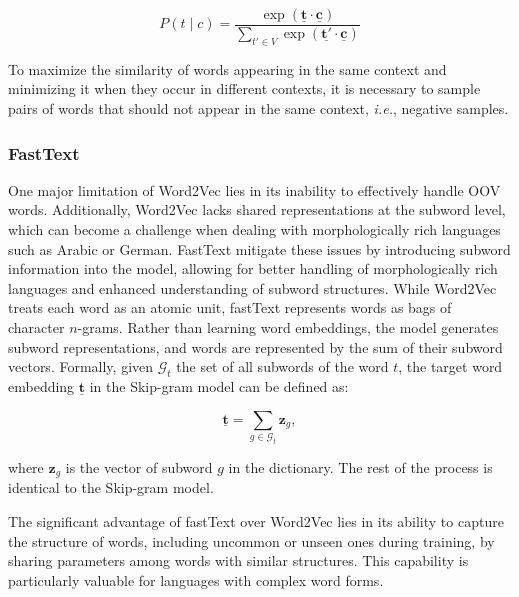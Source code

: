 \begin{equation}
    P(t \mid c) = \frac{\exp (\bm{\underline{t}} \cdot \bm{\underline{c}})}{\sum_{t' \in V} \exp (\bm{\underline{t'}} \cdot \bm{\underline{c}})}
\end{equation}

To maximize the similarity of words appearing in the same context and minimizing it when they occur in different contexts, it is necessary to sample pairs of words that should not appear in the same context, \textit{i.e.}, negative samples. 


\subsubsection{FastText} One major limitation of Word2Vec lies in its inability to effectively handle \ac{OOV} words. Additionally, Word2Vec lacks shared representations at the subword level, which can become a challenge when dealing with morphologically rich languages such as Arabic or German. FastText \citet{bojanowski2017enriching} mitigate these issues by introducing subword information into the model, allowing for better handling of morphologically rich languages and enhanced understanding of subword structures. While Word2Vec treats each word as an atomic unit, fastText represents words as bags of character $n$-grams. Rather than learning word embeddings, the model generates subword representations, and words are represented by the sum of their subword vectors. Formally, given $\mathcal{G}_t$ the set of all subwords of the word $t$, the target word embedding $\bm{\underline{t}}$ in the Skip-gram model can be defined as:

\begin{equation}
    \bm{\underline{t}} = \sum_{g \in \mathcal{G}_t} \bm{z}_g,
\end{equation}

\noindent where $\bm{z}_g$ is the vector of subword $g$ in the dictionary. The rest of the process is identical to the Skip-gram model.

The significant advantage of fastText over Word2Vec lies in its ability to capture the structure of words, including uncommon or unseen ones during training, by sharing parameters among words with similar structures. This capability is particularly valuable for languages with complex word forms. \\


